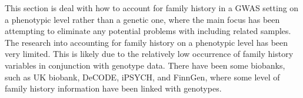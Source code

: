 
This section is deal with how to account for family history in a GWAS setting on a phenotypic level rather than a genetic one, where the main focus has been attempting to eliminate any potential problems with including related samples. The research into accounting for family history on a phenotypic level has been very limited. This is likely due to the relatively low occurrence of family history variables in conjunction with genotype data. There have been some biobanks, such as UK biobank, DeCODE, iPSYCH, and FinnGen, where some level of family history information have been linked with genotypes.



% 






